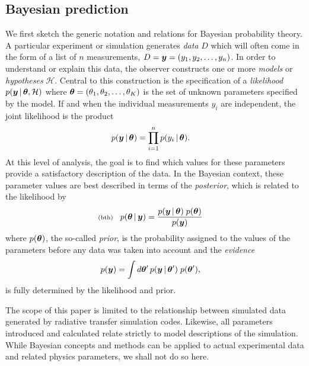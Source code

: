 \documentclass[11pt]{article}
\newcommand{\lleq}[1]{\label{#1} }
\renewcommand{\lleq}[1]{\label{#1} {\scriptstyle {\rm (#1)}} \hspace*{2ex} }
\newcommand{\hypo}  {{\mathcal{H}}}  %
\newcommand{\cond}{\,|\,}
\begin{document}
\subsection{Bayesian prediction}

We first sketch the generic notation and relations for Bayesian
probability theory.
%
A particular experiment or simulation generates \textit{data} $D$
which will often come in the form of a list of $n$ measurements,
$D = {\bm{y}} = (y_1,y_2,\ldots,y_n)$. In order to understand or explain
this data, the observer constructs one or more \textit{models} or
\textit{hypotheses} $\hypo$. Central to this construction is the
specification of a \textit{likelihood} $p(\bmy\cond \bmtheta,\hypo)$
where ${\bm{\theta}} = (\theta_1,\theta_2,\ldots,\theta_K)$ is the set of
unknown parameters specified by the model. If and when the individual
measurements $y_i$ are independent, the joint likelihood is the
product
\begin{align}
  p(\bmy\cond \bmtheta) &= \prod_{i=1}^n p(y_i\cond \bmtheta).
\end{align}
At this level of analysis, the goal
is to find which values for these parameters provide a satisfactory
description of the data. In the Bayesian context, these parameter
values are best described in terms of the \textit{posterior}, which
is related to the likelihood by
\begin{align}
  \lleq{bth}
  p(\bmtheta\cond \bmy)
  &= \frac{p(\bmy\cond\bmtheta)\;p(\bmtheta)}
    {p(\bmy)}
\end{align}
where $p({\bm{\theta}})$, the so-called \textit{prior}, is the probability
assigned to the values of the parameters before any data was taken
into account and the \textit{evidence}
\begin{align}
  p(\bmy) &= \int d\bmtheta'\, p(\bmy\cond\bmtheta')\;p(\bmtheta'),
\end{align}
is fully determined by the likelihood and prior.


The scope of this paper is limited to the relationship between
simulated data generated by radiative transfer simulation codes.
Likewise, all parameters introduced and calculated relate strictly to
model descriptions of the simulation.
%
While Bayesian concepts and methods can be applied to actual
experimental data and related physics parameters, we shall not do so
here.
\end{document}
